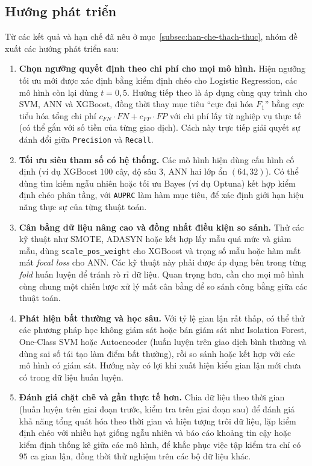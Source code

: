 \subsection{Hướng phát triển}\label{subsec:huong-phat-trien}

Từ các kết quả và hạn chế đã nêu ở mục~\ref{subsec:han-che-thach-thuc}, nhóm đề xuất các hướng phát triển sau:

\begin{enumerate}
    \item \textbf{Chọn ngưỡng quyết định theo chi phí cho mọi mô hình.} Hiện ngưỡng tối ưu mới được xác định bằng kiểm định chéo cho Logistic Regression, các mô hình còn lại dùng $t = 0{,}5$. Hướng tiếp theo là áp dụng cùng quy trình cho SVM, ANN và XGBoost, đồng thời thay mục tiêu ``cực đại hóa $F_1$'' bằng cực tiểu hóa tổng chi phí $c_{FN} \cdot FN + c_{FP} \cdot FP$ với chi phí lấy từ nghiệp vụ thực tế (có thể gắn với số tiền của từng giao dịch). Cách này trực tiếp giải quyết sự đánh đổi giữa \texttt{Precision} và \texttt{Recall}.

    \item \textbf{Tối ưu siêu tham số có hệ thống.} Các mô hình hiện dùng cấu hình cố định (ví dụ XGBoost $100$ cây, độ sâu $3$, ANN hai lớp ẩn $(64, 32)$). Có thể dùng tìm kiếm ngẫu nhiên hoặc tối ưu Bayes (ví dụ Optuna) kết hợp kiểm định chéo phân tầng, với \texttt{AUPRC} làm hàm mục tiêu, để xác định giới hạn hiệu năng thực sự của từng thuật toán.

    \item \textbf{Cân bằng dữ liệu nâng cao và đồng nhất điều kiện so sánh.} Thử các kỹ thuật như SMOTE, ADASYN hoặc kết hợp lấy mẫu quá mức và giảm mẫu, dùng \texttt{scale\_pos\_weight} cho XGBoost và trọng số mẫu hoặc hàm mất mát \textit{focal loss} cho ANN. Các kỹ thuật này phải được áp dụng bên trong từng \textit{fold} huấn luyện để tránh rò rỉ dữ liệu. Quan trọng hơn, cần cho mọi mô hình cùng chung một chiến lược xử lý mất cân bằng để so sánh công bằng giữa các thuật toán.

    \item \textbf{Phát hiện bất thường và học sâu.} Với tỷ lệ gian lận rất thấp, có thể thử các phương pháp học không giám sát hoặc bán giám sát như Isolation Forest, One-Class SVM hoặc Autoencoder (huấn luyện trên giao dịch bình thường và dùng sai số tái tạo làm điểm bất thường), rồi so sánh hoặc kết hợp với các mô hình có giám sát. Hướng này có lợi khi xuất hiện kiểu gian lận mới chưa có trong dữ liệu huấn luyện.

    \item \textbf{Đánh giá chặt chẽ và gần thực tế hơn.} Chia dữ liệu theo thời gian (huấn luyện trên giai đoạn trước, kiểm tra trên giai đoạn sau) để đánh giá khả năng tổng quát hóa theo thời gian và hiện tượng trôi dữ liệu, lặp kiểm định chéo với nhiều hạt giống ngẫu nhiên và báo cáo khoảng tin cậy hoặc kiểm định thống kê giữa các mô hình, để khắc phục việc tập kiểm tra chỉ có $95$ ca gian lận, đồng thời thử nghiệm trên các bộ dữ liệu khác.


\end{enumerate}
